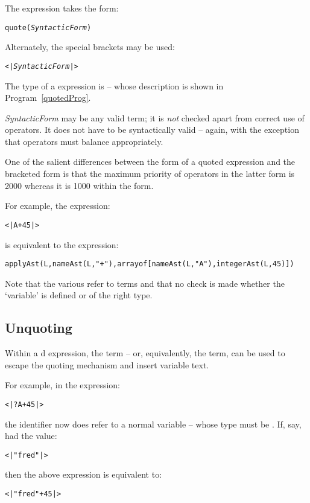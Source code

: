 The  expression takes the form:
\begin{alltt}
quote(\emph{SyntacticForm})
\end{alltt}
Alternately, the special \q{<|} brackets \q{|>} may be used:
\begin{alltt}
<|\emph{SyntacticForm}|>
\end{alltt}
The type of a  expression is  -- whose description is shown in Program~\vref{quotedProg}. 

\emph{SyntacticForm} may be any valid \Sr term; it is \emph{not} checked apart from correct use of operators. It does not have to be syntactically valid -- again, with the exception that operators must balance appropriately.
\begin{aside}
One of the salient differences between the  form of a quoted expression and the \q{<|} bracketed \q{|>} form is that the maximum priority of operators in the latter form is 2000 whereas it is 1000 within the  form.
\end{aside}

For example, the expression:
\begin{alltt}
<|A+45|>
\end{alltt}
is equivalent to the expression:
\begin{alltt}
applyAst(L,nameAst(L,"+"),array of [nameAst(L,"A"), integerAst(L,45)])
\end{alltt}
Note that the various  refer to  terms and that no check is made whether the `variable'  is defined or of the right type.


\subsection{Unquoting}
Within a d expression, the  term -- or, equivalently, the  term, can be used to escape the quoting mechanism and insert variable text.

For example, in the expression:
\begin{alltt}
<| ?A + 45 |>
\end{alltt}
the identifier  now does refer to a normal variable -- whose type must be . If, say,  had the value: 
\begin{alltt}
<| "fred" |>
\end{alltt}
then the above expression is equivalent to:
\begin{alltt}
<| "fred" + 45 |>
\end{alltt}


